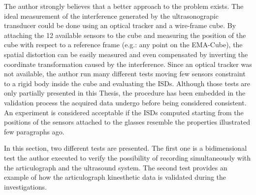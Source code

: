 The author strongly believes that a better approach to the problem exists.
The ideal measurement of the interference generated by the ultrasonograpic
transducer could be done using an optical tracker and a wire-frame cube.
By attaching the 12 available sensors to the cube and measuring the position 
of the cube with respect to a reference frame (e.g.: any point on the  
EMA-Cube), the spatial distortion can be easily measured and even compensated by
inverting the coordinate transformation caused by the interference.
Since an optical tracker was not available, the author run many
different tests moving few sensors constraint to a rigid body inside the cube 
and evaluating the ISDs.
Although those tests are only partially presented in this Thesis, the procedure
has been  embedded in the validation process the acquired data undergo before
being considered consistent.
An experiment is considered acceptable if the ISDs computed starting from 
the positions of the sensors attached to the glasses resemble the properties
illustrated few paragraphs ago.



In this section, two different tests are presented. The first one is a
bidimensional test the author executed to verify the possibility of
recording  simultaneously with the articulograph and the ultrasound system.
The second test provides an example of how the articulograph kinesthetic data is
validated during the investigations.


